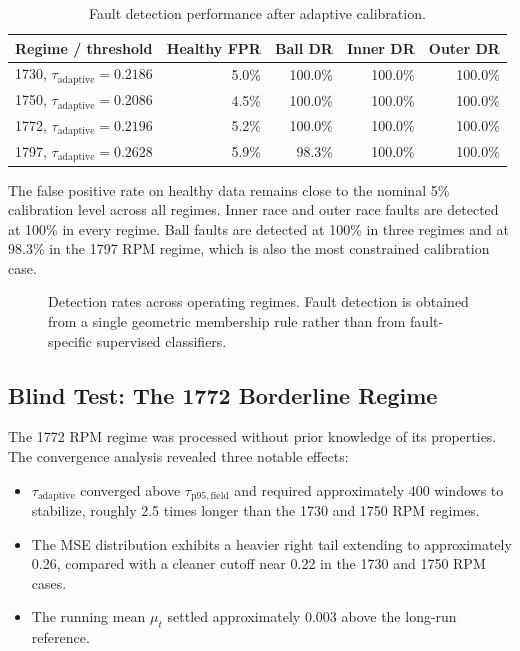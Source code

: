 \documentclass[11pt]{article}
\newcommand{\taufield}{\tau_{\mathrm{p95,field}}}
\newcommand{\tauadapt}{\tau_{\mathrm{adaptive}}}
\begin{document}
\begin{table}[H]
\centering
\caption{Fault detection performance after adaptive calibration.}
\label{tab:detection_rates}
\begin{tabular}{lrrrr}
\toprule
Regime / threshold & Healthy FPR & Ball DR & Inner DR & Outer DR \\
\midrule
1730, $\tauadapt=0.2186$ & 5.0\% & 100.0\% & 100.0\% & 100.0\% \\
1750, $\tauadapt=0.2086$ & 4.5\% & 100.0\% & 100.0\% & 100.0\% \\
1772, $\tauadapt=0.2196$ & 5.2\% & 100.0\% & 100.0\% & 100.0\% \\
1797, $\tauadapt=0.2628$ & 5.9\% & 98.3\% & 100.0\% & 100.0\% \\
\bottomrule
\end{tabular}
\end{table}

The false positive rate on healthy data remains close to the nominal 5\% calibration level across all regimes. Inner race and outer race faults are detected at 100\% in every regime. Ball faults are detected at 100\% in three regimes and at 98.3\% in the 1797 RPM regime, which is also the most constrained calibration case.

\begin{figure}[H]
    \centering
    \caption{Detection rates across operating regimes. Fault detection is obtained from a single geometric membership rule rather than from fault-specific supervised classifiers.}
    \label{fig:detection_rates}
\end{figure}

\subsection{Blind Test: The 1772 Borderline Regime}

The 1772 RPM regime was processed without prior knowledge of its properties. The convergence analysis revealed three notable effects:

\begin{itemize}
    \item $\tauadapt$ converged above $\taufield$ and required approximately 400 windows to stabilize, roughly 2.5 times longer than the 1730 and 1750 RPM regimes.
    \item The MSE distribution exhibits a heavier right tail extending to approximately 0.26, compared with a cleaner cutoff near 0.22 in the 1730 and 1750 RPM cases.
    \item The running mean $\mu_t$ settled approximately 0.003 above the long-run reference.
\end{itemize}
\end{document}
